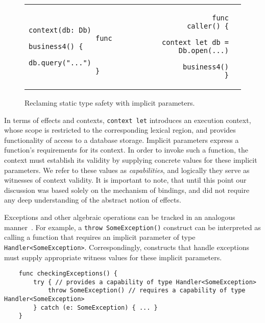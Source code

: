 \documentclass[acmsmall]{acmart}
\begin{document}
\begin{figure}[h]
    \begin{tabular}{p{} rl}
        \begin{minipage}[t]{0.3\textwidth}
            \begin{verbatim}
                context(db: Db)
                func business4() {
                    db.query("...")
                }
            \end{verbatim}
        \end{minipage}
        &
        \begin{minipage}[t]{0.3\textwidth}
            \begin{verbatim}
                func caller() {
                    context let db = Db.open(...)
                    business4()
                }
            \end{verbatim}
        \end{minipage}
    \end{tabular}
    \caption{Reclaming static type safety with implicit parameters.}
    \label{fig:implicits}
\end{figure}

In terms of effects and contexts, \texttt{context let} introduces an execution context, whose scope is restricted to the corresponding lexical region, and provides functionality of access to a database storage.
Implicit parameters express a function's requirements for its context.
In order to invoke such a function, the context must establish its validity by supplying concrete values for these implicit parameters.
We refer to these values as \textit{capabilities}, and logically they serve as witnesses of context validity.
It is important to note, that until this point our discussion was based solely on the mechanism of bindings, and did not require any deep understanding of the abstract notion of effects.

Exceptions and other algebraic operations can be tracked in an analogous manner~\cite{odersky2021safer}.
For example, a \texttt{throw SomeException()} construct can be interpreted as calling a function that requires an implicit parameter of type \texttt{Handler<SomeException>}.
Correspondingly, constructs that handle exceptions must supply appropriate witness values for these implicit parameters.
\begin{verbatim}
    func checkingExceptions() {
        try { // provides a capability of type Handler<SomeException>
            throw SomeException() // requires a capability of type Handler<SomeException>
        } catch (e: SomeException) { ... }
    }
\end{verbatim}
\end{document}
